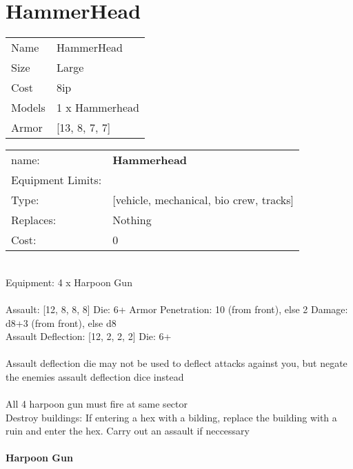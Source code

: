\pagebreak\pagebreak

\section{ HammerHead }

\begin{tabular}{ll}
  Name & HammerHead \\
  Size & Large\\
  Cost & 8ip\\
  Models & 1 x Hammerhead\\
  Armor & [13, 8, 7, 7]\\
\end{tabular}

\noindent 

\noindent
\begin{tabular}{ll}
name: &{\bf Hammerhead } \\
Equipment Limits: & \\
Type: &[vehicle, mechanical, bio crew, tracks] \\
Replaces: &Nothing \\
Cost: & 0\\
\end{tabular}
\ \\
Equipment: 4 x Harpoon Gun \\
\ \\
Assault: [12, 8, 8, 8] Die: 6+ Armor Penetration: 10 (from front), else 2 Damage: d8+3 (from front), else d8 \\
Assault Deflection: [12, 2, 2, 2] Die: 6+\\
\\ 
Assault deflection die may not be used to deflect attacks against you, but negate the enemies assault deflection dice instead\\ 
 
\ \\
All 4 harpoon gun must fire at same sector\\ 
Destroy buildings: If entering a hex with a bilding, replace the building with a ruin and enter the hex. Carry out an assault if neccessary\\ 

\ \\
{\bf Harpoon Gun } \\



